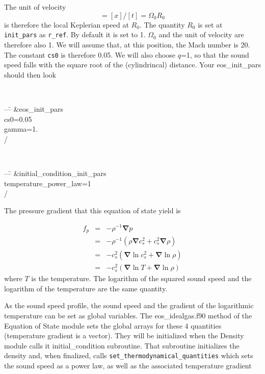 \documentclass[a4paper,10pt]{article}
\renewcommand{\v}[1]{{\boldsymbol #1}} %
\newcommand{\del}{\v{\nabla}}
\newcommand{\grad}{\del}
\begin{document}
The unit of velocity 
\begin{equation}
[\v{u}]=[x]/[t]=\Omega_0 R_0
\end{equation}is therefore the local
Keplerian speed at $R_0$. The quantity $R_0$ is set at {\tt
  init\_pars} as {\tt r\_ref}. By default it is set to 1. $\Omega_0$ and the unit of velocity are therefore also 1. We will assume that, at this position, the Mach number is 20. The constant {\tt cs0} is therefore 0.05. We will also choose $q$=1, so that the sound speed falls with the square root of the (cylindrincal) distance. Your eos\_init\_pars should then look

{\tt 
\begin{tabbing}
  ---\=\kill
\&eos\_init\_pars\\
  \>cs0=0.05\\
  \>gamma=1.\\
/
\end{tabbing}
}

{\tt 
\begin{tabbing}
  ---\=\kill
\&initial\_condition\_init\_pars\\
  \> temperature\_power\_law=1\\
/
\end{tabbing}
}

The pressure gradient that this equation of state yield is 

\begin{eqnarray}
f_p&=&-\rho^{-1} \grad{p} \\
   &=& -\rho^{-1}\left(\rho \grad{c_s^2} + c_s^2\grad{\rho}\right)\\
   &=&  -c_s^2\left(\grad{\ln c_s^2} + \grad{\ln \rho}\right)  \\
   &=& -c_s^2\left(\grad{\ln T} + \grad{\ln \rho}\right)   \nonumber
\end{eqnarray}where $T$ is the temperature. The logarithm of the squared sound speed and the logarithm of the temperature are the same quantity.


As the sound speed profile, the sound speed and the gradient of the
logarithmic temperature can be set as global variables. The
eos\_idealgas.f90 method of the Equation of State module sets the
global arrays for these 4 quantities (temperature gradient is a
vector). They will be initialized when the Density module calls it
initial\_condition subroutine. That subroutine initializes the density
and, when finalized, calls {\tt set\_thermodynamical\_quantities}
which sets the sound speed as a power law, 
as well as the associated temperature gradient
\end{document}
